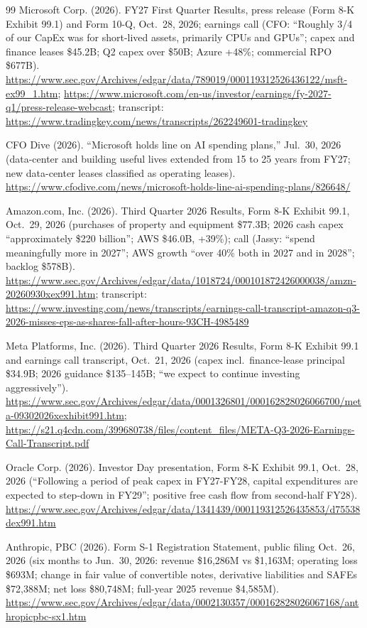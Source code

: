 \documentclass[11pt,letterpaper]{article}
\begin{document}
\begin{thebibliography}{99}
Microsoft Corp. (2026). FY27 First Quarter Results, press release (Form 8-K Exhibit 99.1) and Form 10-Q, Oct.~28, 2026; earnings call (CFO: ``Roughly 3/4 of our CapEx was for short-lived assets, primarily CPUs and GPUs''; capex and finance leases \$45.2B; Q2 capex over \$50B; Azure +48\%; commercial RPO \$677B). \url{https://www.sec.gov/Archives/edgar/data/789019/000119312526436122/msft-ex99_1.htm}; \url{https://www.microsoft.com/en-us/investor/earnings/fy-2027-q1/press-release-webcast}; transcript: \url{https://www.tradingkey.com/news/transcripts/262249601-tradingkey}

CFO Dive (2026). ``Microsoft holds line on AI spending plans,'' Jul.~30, 2026 (data-center and building useful lives extended from 15 to 25 years from FY27; new data-center leases classified as operating leases). \url{https://www.cfodive.com/news/microsoft-holds-line-ai-spending-plans/826648/}

Amazon.com, Inc. (2026). Third Quarter 2026 Results, Form 8-K Exhibit 99.1, Oct.~29, 2026 (purchases of property and equipment \$77.3B; 2026 cash capex ``approximately \$220 billion''; AWS \$46.0B, +39\%); call (Jassy: ``spend meaningfully more in 2027''; AWS growth ``over 40\% both in 2027 and in 2028''; backlog \$578B). \url{https://www.sec.gov/Archives/edgar/data/1018724/000101872426000038/amzn-20260930xex991.htm}; transcript: \url{https://www.investing.com/news/transcripts/earnings-call-transcript-amazon-q3-2026-misses-eps-as-shares-fall-after-hours-93CH-4985489}

Meta Platforms, Inc. (2026). Third Quarter 2026 Results, Form 8-K Exhibit 99.1 and earnings call transcript, Oct.~21, 2026 (capex incl.\ finance-lease principal \$34.9B; 2026 guidance \$135--145B; ``we expect to continue investing aggressively''). \url{https://www.sec.gov/Archives/edgar/data/0001326801/000162828026066700/meta-09302026xexhibit991.htm}; \url{https://s21.q4cdn.com/399680738/files/content_files/META-Q3-2026-Earnings-Call-Transcript.pdf}

Oracle Corp. (2026). Investor Day presentation, Form 8-K Exhibit 99.1, Oct.~28, 2026 (``Following a period of peak capex in FY27-FY28, capital expenditures are expected to step-down in FY29''; positive free cash flow from second-half FY28). \url{https://www.sec.gov/Archives/edgar/data/1341439/000119312526435853/d75538dex991.htm}

Anthropic, PBC (2026). Form S-1 Registration Statement, public filing Oct.~26, 2026 (six months to Jun.~30, 2026: revenue \$16,286M vs \$1,163M; operating loss \$693M; change in fair value of convertible notes, derivative liabilities and SAFEs \$72,388M; net loss \$80,748M; full-year 2025 revenue \$4,585M). \url{https://www.sec.gov/Archives/edgar/data/0002130357/000162828026067168/anthropicpbc-sx1.htm}


\end{thebibliography}
\end{document}
